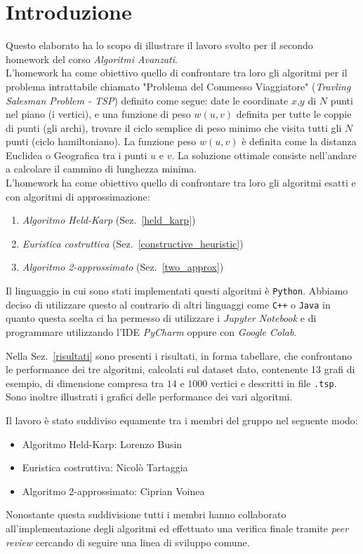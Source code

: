 \section{Introduzione}
Questo elaborato ha lo scopo di illustrare il lavoro svolto per il secondo homework del corso \textit{Algoritmi Avanzati}.\\
L'homework ha come obiettivo quello di confrontare tra loro gli algoritmi per il problema intrattabile chiamato "Problema del Commesso Viaggiatore" (\textit{Travling Salesman Problem - TSP}) definito come segue: date le coordinate $x$,$y$ di $N$ punti nel piano (i vertici), e una funzione di peso $w(u,v)$ definita per tutte le coppie di punti (gli archi), trovare il ciclo semplice di peso minimo che visita tutti gli $N$ punti (ciclo hamiltoniano). La funzione peso $w(u,v)$ è definita come la distanza Euclidea o Geografica tra i punti $u$ e $v$. La soluzione ottimale consiste nell'andare a calcolare il cammino di lunghezza minima.  
\\
L'homework ha come obiettivo quello di confrontare tra loro gli algoritmi esatti e con algoritmi di approssimazione:
\begin{enumerate}
	\item \textit{Algoritmo Held-Karp} (Sez.~\ref{held_karp})
	\item \textit{Euristica costruttiva} (Sez.~\ref{constructive_heuristic})
	\item \textit{Algoritmo 2-approssimato} (Sez.~\ref{two_approx})
\end{enumerate}


Il linguaggio in cui sono stati implementati questi algoritmi è \texttt{Python}.
Abbiamo deciso di utilizzare questo al contrario di altri linguaggi come \texttt{C++} o \texttt{Java} in quanto questa scelta ci ha permesso di utilizzare i \textit{Jupyter Notebook} e di programmare utilizzando l'IDE \textit{PyCharm} oppure con \textit{Google Colab}.

Nella Sez.~\ref{risultati} sono presenti i risultati, in forma tabellare, che confrontano le performance dei tre algoritmi, calcolati sul dataset dato, contenente 13 grafi di esempio, di dimensione compresa tra $14$ e $1000$ vertici e descritti in file \texttt{.tsp}.
Sono inoltre illustrati i grafici delle performance dei vari algoritmi.

Il lavoro è stato suddiviso equamente tra i membri del gruppo nel seguente modo:
\begin{itemize}
	\item Algoritmo Held-Karp: Lorenzo Busin
	\item Euristica costruttiva: Nicolò Tartaggia
	\item Algoritmo 2-approssimato: Ciprian Voinea
\end{itemize}

Nonostante questa suddivisione tutti i membri hanno collaborato all'implementazione degli algoritmi ed effettuato una verifica finale tramite \textit{peer review} cercando di seguire una linea di sviluppo comune.
\pagebreak

